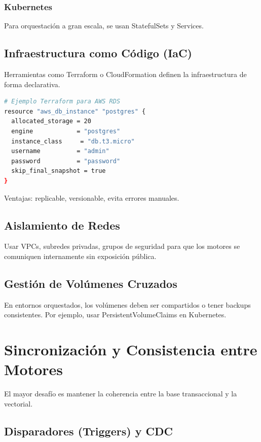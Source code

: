\documentclass[12pt,a4paper,openany,oneside]{book}
\begin{document}
\subsection{Kubernetes}
Para orquestación a gran escala, se usan StatefulSets y Services.

\section{Infraestructura como Código (IaC)}
Herramientas como Terraform o CloudFormation definen la infraestructura de forma declarativa.
\begin{lstlisting}[language=Bash, basicstyle=\ttfamily\small]
# Ejemplo Terraform para AWS RDS
resource "aws_db_instance" "postgres" {
  allocated_storage = 20
  engine            = "postgres"
  instance_class     = "db.t3.micro"
  username          = "admin"
  password          = "password"
  skip_final_snapshot = true
}
\end{lstlisting}
Ventajas: replicable, versionable, evita errores manuales.

\section{Aislamiento de Redes}
Usar VPCs, subredes privadas, grupos de seguridad para que los motores se comuniquen internamente sin exposición pública.

\section{Gestión de Volúmenes Cruzados}
En entornos orquestados, los volúmenes deben ser compartidos o tener backups consistentes. Por ejemplo, usar PersistentVolumeClaims en Kubernetes.

\chapter{Sincronización y Consistencia entre Motores}
El mayor desafío es mantener la coherencia entre la base transaccional y la vectorial.

\section{Disparadores (Triggers) y CDC}
\end{document}
